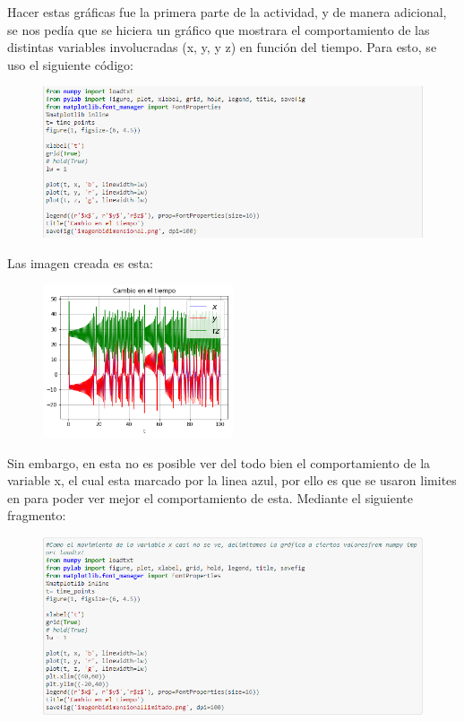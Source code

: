 \documentclass{article}
\begin{document}
Hacer estas gráficas fue la primera parte de la actividad, y de manera adicional, se nos pedía que se hiciera un gráfico que mostrara el comportamiento de las distintas variables involucradas (x, y, y z) en función del tiempo. Para esto, se uso el siguiente código:
\begin{figure}[H]
    \includegraphics[width=1\textwidth]{Celda6.PNG}
    \centering
    \label{Cod}
\end{figure}
Las imagen creada es esta:
\begin{figure}[H]
    \includegraphics[width=0.5\textwidth]{Grafica1.png}
    \centering
    \label{Grad}
\end{figure}
Sin embargo, en esta no es posible ver del todo bien el comportamiento de la variable x, el cual esta marcado por la linea azul, por ello es que se usaron limites en para poder ver mejor el comportamiento de esta. Mediante el siguiente fragmento:
\begin{figure}[H]
    \includegraphics[width=1\textwidth]{Celda7.PNG}
    \centering
    \label{Cod}
\end{figure}
\end{document}

